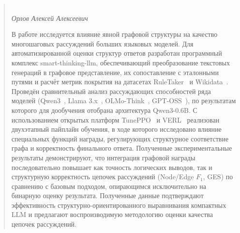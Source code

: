 \begin{abstract}

    \begin{center}
        \large{} \\
    \large\textit{Орлов Алексей Алексеевич} \\[1 cm]
    \end{center}

    В работе исследуется влияние явной графовой структуры на качество многошаговых рассуждений больших языковых моделей.
    Для автоматизированной оценки структур ответов разработан программный комплекс
    \mbox{smart-thinking-llm},
    обеспечивающий преобразование текстовых генераций в графовое представление, их сопоставление с эталонными путями и
    расчёт метрик покрытия на датасетах RuleTaker~\cite{clark2020ruletaker} и Wikidata~\cite{vrandecic2014wikidata}.
    Проведён сравнительный анализ рассуждающих способностей
    ряда моделей (Qwen3~\cite{yang2025qwen3}, Llama 3.x~\cite{touvron2023llama}, OLMo-Think~\cite{groeneveld2024olmo}, GPT-OSS~\cite{openai2023gpt4}), по результатам которого для дообучения отобрана архитектура Qwen3-0.6B.
    С использованием открытых платформ TunePPO~\cite{tuneppo2024} и VERL~\cite{sheng2024verl} реализован двухэтапный пайплайн обучения, в ходе которого исследовано влияние
    специальных функций награды, регулирующих структурное соответствие графа и корректность финального ответа.
    Полученные экспериментальные результаты демонстрируют, что интеграция графовой
    награды последовательно повышает как точность логических выводов, так и структурную корректность цепочек рассуждений (Node/Edge $F_1$, GES) по сравнению
    с базовым подходом, опирающимся исключительно на бинарную оценку результата. Полученные данные подтверждают эффективность
    структурно-ориентированного выравнивания компактных LLM и предлагают воспроизводимую методологию оценки качества цепочек
    рассуждений.

    \vfill


\end{abstract}
